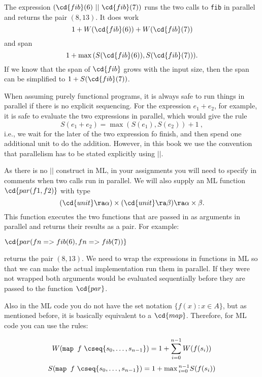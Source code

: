 \begin{flex}
\begin{example}
The expression $(\cd{fib}(6)\ ||\ \cd{fib}(7))$ runs the two
calls to {\tt fib} in parallel and returns the pair $(8,13)$.   It
does work 
\[
1 + W(\cd{fib}(6)) + W(\cd{fib}(7))
\] 
and span
\[
1 + \max{}(S(\cd{fib}(6)), S(\cd{fib}(7))).
\]   
If we know that the
span of $\cd{fib}$ grows with the input size, then the span can
be simplified to $1 + S(\cd{fib}(7))$.
\end{example}
\end{flex}

\begin{remark}
When assuming purely functional programs, it is
always safe to run things in parallel if there is no explicit
sequencing.     For the expression $e_1 + e_2$, for example, it is
safe to evaluate the
two expressions in parallel, which would give the rule
\[
S(e_1 + e_2) = \max{}(S(e_1), S(e_2)) + 1~,
\]
i.e., we wait for the later of the two expression fo finish, and then spend one
additional unit to do the addition.
However, in this book we use the convention that parallelism has to be stated
explicitly using $||$.
\end{remark}

\begin{teachnote}
As there is no $||$
construct in ML, in your assignments you will need to specify in comments when two calls run
in parallel.  We will also supply an ML function $\cd{par (f1,f2)}$ with
type 
%
\[
(\cd{unit} \ra \alpha) \times (\cd{unit} \ra \beta) \ra \alpha
\times \beta.
\]
This function executes the two functions that are passed in as
arguments in parallel and returns their results as a pair.  For
example:

$\cd{par (fn => fib(6), fn => fib(7))}$

returns the pair $(8,13)$.  We need to wrap the expressions in
functions in ML so that we can make the actual implementation run them
in parallel.  If they were not wrapped both arguments would be
evaluated sequentially before they are passed to the function
$\cd{par}$.  

Also in the ML code you do not have the set
notation $\{f(x) : x \in A\}$, but as mentioned before, it is
basically equivalent to a
$\cd{map}$.   Therefore, for ML code you can use the rules:

  \[ W(\mbox{\tt map } f\ \cseq{s_0, \ldots, s_{n-1}}) = 1 + \sum_{i=0}^{n-1} W(f(s_i)) \]
   \[S(\mbox{\tt map } f\ \cseq{s_0, \ldots, s_{n-1}}) = 1 + \max{}_{i=0}^{n-1} S(f(s_i)) \]

\end{teachnote}

